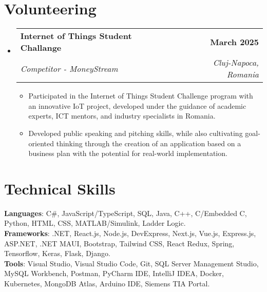 \documentclass[letterpaper,11pt]{article}
\makeatletter
\newcommand{\resumeItem}[1]{
  \item\small{
    {#1 \vspace{-2pt}}
  }
}
\newcommand{\resumeSubheading}[4]{
  \vspace{-2pt}\item
    \begin{tabular*}{1.0\textwidth}[t]{l@{\extracolsep{\fill}}r}
      \textbf{#1} & \textbf{\small #2} \\
      \textit{\small#3} & \textit{\small #4} \\
    \end{tabular*}\vspace{-7pt}
}
\newcommand{\resumeSubHeadingListStart}{\begin{itemize}[leftmargin=0.0in, label={}]}
\newcommand{\resumeSubHeadingListEnd}{\end{itemize}}
\newcommand{\resumeItemListStart}{\begin{itemize}}
\newcommand{\resumeItemListEnd}{\end{itemize}\vspace{-5pt}}
\makeatother
\begin{document}
\section{Volunteering}
    \resumeSubHeadingListStart
        \resumeSubheading{Internet of Things Student Challange }{March 2025}{Competitor - MoneyStream }{Cluj-Napoca, Romania}
        \vspace{2pt}
            \resumeItemListStart
                \resumeItem{Participated in the Internet of Things Student Challenge program with an innovative IoT project, developed under the guidance of academic experts, ICT mentors, and industry specialists in Romania.}
                \resumeItem{Developed public speaking and pitching skills, while also cultivating goal-oriented thinking through the creation of an application based on a business plan with the potential for real-world implementation.}
            \resumeItemListEnd
    \resumeSubHeadingListEnd
%
\section{Technical Skills}
 \begin{itemize}[leftmargin=0.15in, label={}]
    \small{\item{
     \textbf{Languages}{: \mbox{C{\#}}, JavaScript/TypeScript, SQL, Java, C++, C/Embedded C, Python, HTML, CSS, MATLAB/Simulink, Ladder Logic.} \\
     \textbf{Frameworks}{: .NET, React.js, Node.js, DevExpress, Next.js, Vue.js, Express.js, ASP.NET, .NET MAUI, Bootstrap, Tailwind CSS, React Redux, Spring, Tensorflow, Keras, Flask, Django.} \\
     \textbf{Tools}{: Visual Studio, Visual Studio Code, Git, SQL Server Management Studio, MySQL Workbench, Postman, PyCharm IDE, IntelliJ IDEA, Docker, Kubernetes, MongoDB Atlas, Arduino IDE, Siemens TIA Portal.} }}
 \end{itemize}
 \vspace{-16pt}
\end{document}
